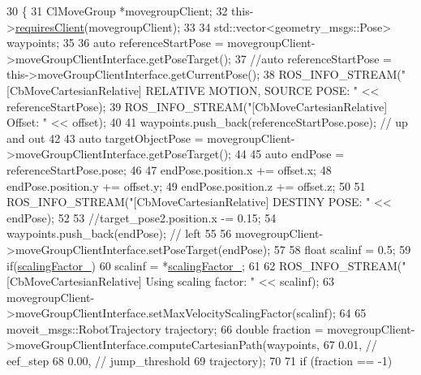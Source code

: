 \begin{DoxyCode}
30 \{
31     ClMoveGroup *movegroupClient;
32     this->\hyperlink{classsmacc_1_1SmaccClientBehavior_a917f001e763a1059af337bf4e164f542}{requiresClient}(movegroupClient);
33 
34     std::vector<geometry\_msgs::Pose> waypoints;
35 
36     \textcolor{keyword}{auto} referenceStartPose = movegroupClient->moveGroupClientInterface.getPoseTarget();
37     \textcolor{comment}{//auto referenceStartPose = this->moveGroupClientInterface.getCurrentPose();}
38     ROS\_INFO\_STREAM(\textcolor{stringliteral}{"[CbMoveCartesianRelative] RELATIVE MOTION, SOURCE POSE: "} << referenceStartPose);
39     ROS\_INFO\_STREAM(\textcolor{stringliteral}{"[CbMoveCartesianRelative] Offset: "} << offset);
40 
41     waypoints.push\_back(referenceStartPose.pose); \textcolor{comment}{// up and out}
42 
43     \textcolor{keyword}{auto} targetObjectPose = movegroupClient->moveGroupClientInterface.getPoseTarget();
44 
45     \textcolor{keyword}{auto} endPose = referenceStartPose.pose;
46 
47     endPose.position.x += offset.x;
48     endPose.position.y += offset.y;
49     endPose.position.z += offset.z;
50 
51     ROS\_INFO\_STREAM(\textcolor{stringliteral}{"[CbMoveCartesianRelative] DESTINY POSE: "} << endPose);
52 
53     \textcolor{comment}{//target\_pose2.position.x -= 0.15;}
54     waypoints.push\_back(endPose); \textcolor{comment}{// left}
55 
56     movegroupClient->moveGroupClientInterface.setPoseTarget(endPose);
57 
58     \textcolor{keywordtype}{float} scalinf = 0.5;
59     \textcolor{keywordflow}{if}(\hyperlink{classmoveit__z__client_1_1CbMoveCartesianRelative_a0d483fda685fe6ef7e68240ae5b2140d}{scalingFactor\_})
60         scalinf = *\hyperlink{classmoveit__z__client_1_1CbMoveCartesianRelative_a0d483fda685fe6ef7e68240ae5b2140d}{scalingFactor\_};
61 
62     ROS\_INFO\_STREAM(\textcolor{stringliteral}{"[CbMoveCartesianRelative] Using scaling factor: "} << scalinf);
63     movegroupClient->moveGroupClientInterface.setMaxVelocityScalingFactor(scalinf);
64 
65     moveit\_msgs::RobotTrajectory trajectory;
66     \textcolor{keywordtype}{double} fraction = movegroupClient->moveGroupClientInterface.computeCartesianPath(waypoints,
67                                                                                      0.01, \textcolor{comment}{// eef\_step}
68                                                                                      0.00,  \textcolor{comment}{//
       jump\_threshold}
69                                                                                      trajectory);
70 
71     \textcolor{keywordflow}{if} (fraction == -1)

\end{DoxyCode}

